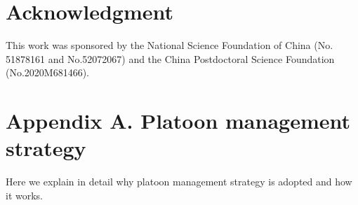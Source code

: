 \documentclass[journal]{IEEEtran}
\begin{document}
%





\section*{Acknowledgment}


This work was sponsored by the National Science Foundation of China (No. 51878161 and No.52072067) and the China Postdoctoral Science Foundation (No.2020M681466).




\appendix
\section*{Appendix A. Platoon management strategy}
\label{appendix1}
Here we explain in detail why platoon management strategy is adopted and how it works.
\end{document}
